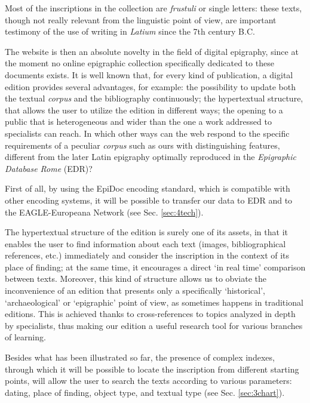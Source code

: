 \documentclass[amsthm,ebook]{saparticle}
\begin{document}
Most of the inscriptions in the collection are \emph{frustuli} or single letters: these texts, though not really relevant from
the linguistic point of view, are important testimony of the use of writing in \emph{Latium} since the 7th century B.C. 

The website is then an absolute novelty in the field of digital epigraphy, since at the moment no online epigraphic
collection specifically dedicated to these documents exists. It is well known that, for every kind of publication, a
digital edition provides several advantages, for example: the possibility to update both the textual \emph{corpus} and the
bibliography continuously; the hypertextual structure, that allows the user to utilize the edition in different ways;
the opening to a public that is heterogeneous and wider than the one a work addressed to specialists can reach. In
which other ways can the web respond to the specific requirements of a peculiar \emph{corpus} such as ours with distinguishing
features, different from the later Latin epigraphy optimally reproduced in the \emph{Epigraphic Database Rome} (EDR)?

First of all, by using the EpiDoc encoding standard, which is compatible with other encoding systems, it will be
possible to transfer our data to EDR and to the EAGLE-Europeana Network (see Sec. \ref{sec:4tech}).

The hypertextual structure of the edition is surely one of its assets, in that it enables the user to find information
about each text (images, bibliographical references, etc.) immediately and consider the inscription in the context of
its place of finding; at the same time, it encourages a direct `in real time' comparison between texts. Moreover,
this kind of structure allows us to obviate the inconvenience of an edition that presents only a specifically
`historical', `archaeological' or `epigraphic' point of view, as sometimes happens in traditional
editions. This is achieved thanks to cross-references to topics analyzed in depth by specialists, thus making our
edition a useful research tool for various branches of learning.

Besides what has been illustrated so far, the presence of complex indexes, through which it will be possible to locate
the inscription from different starting points, will allow the user to search the texts according to various
parameters: dating, place of finding, object type, and textual type (see Sec. \ref{sec:3chart}). 
\end{document}
